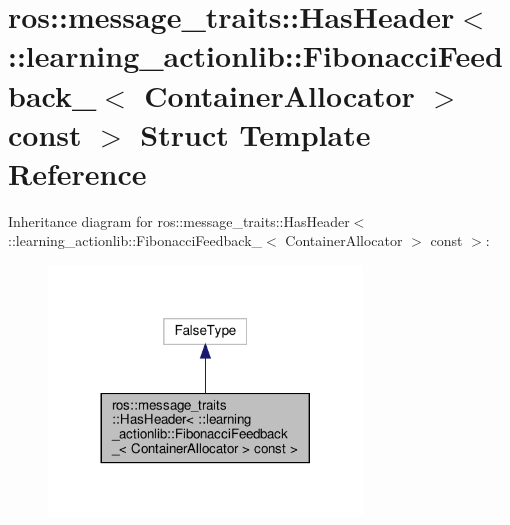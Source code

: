 \hypertarget{structros_1_1message__traits_1_1HasHeader_3_01_1_1learning__actionlib_1_1FibonacciFeedback___3_010a75e4231958f861a183d152eab481a}{}\section{ros\+:\+:message\+\_\+traits\+:\+:Has\+Header$<$ \+:\+:learning\+\_\+actionlib\+:\+:Fibonacci\+Feedback\+\_\+$<$ Container\+Allocator $>$ const $>$ Struct Template Reference}
\label{structros_1_1message__traits_1_1HasHeader_3_01_1_1learning__actionlib_1_1FibonacciFeedback___3_010a75e4231958f861a183d152eab481a}


Inheritance diagram for ros\+:\+:message\+\_\+traits\+:\+:Has\+Header$<$ \+:\+:learning\+\_\+actionlib\+:\+:Fibonacci\+Feedback\+\_\+$<$ Container\+Allocator $>$ const $>$\+:
\nopagebreak
\begin{figure}[H]
\begin{center}
\leavevmode
\includegraphics[width=236pt]{structros_1_1message__traits_1_1HasHeader_3_01_1_1learning__actionlib_1_1FibonacciFeedback___3_0c4d120e15a43c80c996d80b681e72756}
\end{center}
\end{figure}



